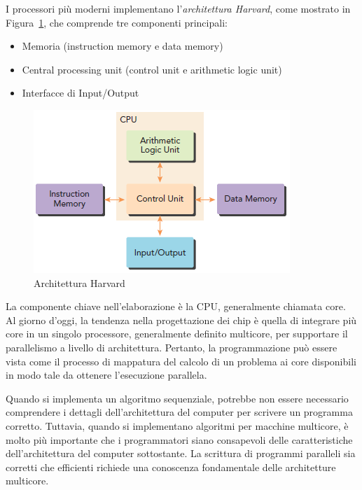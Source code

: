 I processori più moderni implementano l'\emph{architettura Harvard}, come mostrato in Figura~\ref{fig:Harvard_architecture}, che comprende tre componenti principali:
\begin{itemize}
	\item Memoria (instruction memory e data memory)
	\item Central processing unit (control unit e arithmetic logic unit)
	\item Interfacce di Input/Output
\end{itemize}
\begin{figure}[h!]
	\centering
	\includegraphics[width=.5\textwidth]{Immagini/CUDA/Harvard_architecture}
	\caption{Architettura Harvard \cite{Cheng:ProfessionalCudaProgramming}}
	\label{fig:Harvard_architecture}
\end{figure}
La componente chiave nell'elaborazione è la CPU, generalmente chiamata core. Al giorno d'oggi, la tendenza nella progettazione dei chip è quella di integrare più core in un singolo processore, generalmente definito multicore, per supportare il parallelismo a livello di architettura. Pertanto, la programmazione può essere vista come il processo di mappatura del calcolo di un problema ai core disponibili in modo tale da ottenere l'esecuzione parallela.

Quando si implementa un algoritmo sequenziale, potrebbe non essere necessario comprendere i dettagli dell'architettura del computer per scrivere un programma corretto. Tuttavia, quando si implementano algoritmi per macchine multicore, è molto più importante che i programmatori siano consapevoli delle caratteristiche dell'architettura del computer sottostante. La scrittura di programmi paralleli sia corretti che efficienti richiede una conoscenza fondamentale delle architetture multicore.
